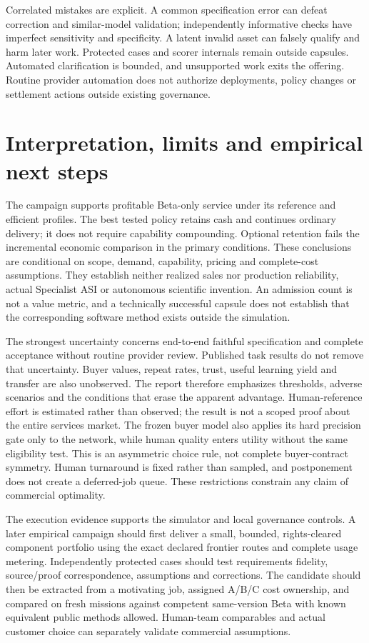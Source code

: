 \documentclass[11pt,letterpaper]{article}
\begin{document}
Correlated mistakes are explicit. A common specification error can defeat correction and similar-model validation; independently informative checks have imperfect sensitivity and specificity. A latent invalid asset can falsely qualify and harm later work. Protected cases and scorer internals remain outside capsules. Automated clarification is bounded, and unsupported work exits the offering. Routine provider automation does not authorize deployments, policy changes or settlement actions outside existing governance.

\section{Interpretation, limits and empirical next steps}

The campaign supports profitable Beta-only service under its reference and efficient profiles. The best tested policy retains cash and continues ordinary delivery; it does not require capability compounding. Optional retention fails the incremental economic comparison in the primary conditions. These conclusions are conditional on scope, demand, capability, pricing and complete-cost assumptions. They establish neither realized sales nor production reliability, actual Specialist ASI or autonomous scientific invention. An admission count is not a value metric, and a technically successful capsule does not establish that the corresponding software method exists outside the simulation.

The strongest uncertainty concerns end-to-end faithful specification and complete acceptance without routine provider review. Published task results do not remove that uncertainty. Buyer values, repeat rates, trust, useful learning yield and transfer are also unobserved. The report therefore emphasizes thresholds, adverse scenarios and the conditions that erase the apparent advantage. Human-reference effort is estimated rather than observed; the result is not a scoped proof about the entire services market. The frozen buyer model also applies its hard precision gate only to the network, while human quality enters utility without the same eligibility test. This is an asymmetric choice rule, not complete buyer-contract symmetry. Human turnaround is fixed rather than sampled, and postponement does not create a deferred-job queue. These restrictions constrain any claim of commercial optimality.

The execution evidence supports the simulator and local governance controls. A later empirical campaign should first deliver a small, bounded, rights-cleared component portfolio using the exact declared frontier routes and complete usage metering. Independently protected cases should test requirements fidelity, source/proof correspondence, assumptions and corrections. The candidate should then be extracted from a motivating job, assigned A/B/C cost ownership, and compared on fresh missions against competent same-version Beta with known equivalent public methods allowed. Human-team comparables and actual customer choice can separately validate commercial assumptions.
\end{document}
